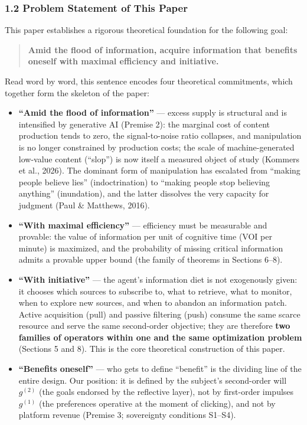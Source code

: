 \documentclass[
  11pt]{article}
\providecommand{\tightlist}{%
  \setlength{\itemsep}{0pt}\setlength{\parskip}{0pt}}
\begin{document}
\subsubsection{1.2 Problem Statement of This
Paper}\label{problem-statement-of-this-paper}

This paper establishes a rigorous theoretical foundation for the
following goal:

\begin{quote}
\textbf{Amid the flood of information, acquire information that benefits
oneself with maximal efficiency and initiative.}
\end{quote}

Read word by word, this sentence encodes four theoretical commitments,
which together form the skeleton of the paper:

\begin{itemize}
\tightlist
\item
  \textbf{``Amid the flood of information''} --- excess supply is
  structural and is intensified by generative AI (Premise 2): the
  marginal cost of content production tends to zero, the signal-to-noise
  ratio collapses, and manipulation is no longer constrained by
  production costs; the scale of machine-generated low-value content
  (``slop'') is now itself a measured object of study (Kommers et al.,
  2026). The dominant form of manipulation has escalated from ``making
  people believe lies'' (indoctrination) to ``making people stop
  believing anything'' (inundation), and the latter dissolves the very
  capacity for judgment (Paul \& Matthews, 2016).
\item
  \textbf{``With maximal efficiency''} --- efficiency must be measurable
  and provable: the value of information per unit of cognitive time (VOI
  per minute) is maximized, and the probability of missing critical
  information admits a provable upper bound (the family of theorems in
  Sections 6--8).
\item
  \textbf{``With initiative''} --- the agent's information diet is not
  exogenously given: it chooses which sources to subscribe to, what to
  retrieve, what to monitor, when to explore new sources, and when to
  abandon an information patch. Active acquisition (pull) and passive
  filtering (push) consume the same scarce resource and serve the same
  second-order objective; they are therefore \textbf{two families of
  operators within one and the same optimization problem} (Sections 5
  and 8). This is the core theoretical construction of this paper.
\item
  \textbf{``Benefits oneself''} --- who gets to define ``benefit'' is
  the dividing line of the entire design. Our position: it is defined by
  the subject's second-order will \(g^{(2)}\) (the goals endorsed by the
  reflective layer), not by first-order impulses \(g^{(1)}\) (the
  preferences operative at the moment of clicking), and not by platform
  revenue (Premise 3; sovereignty conditions S1--S4).
\end{itemize}
\end{document}
